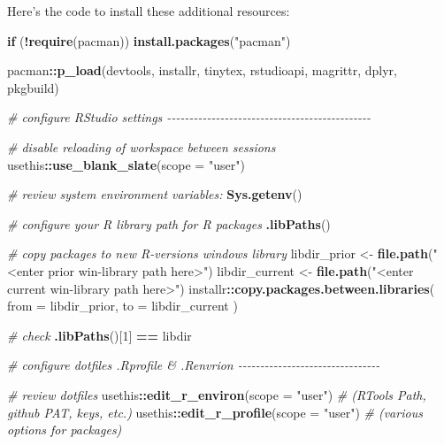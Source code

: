 \documentclass[
]{book}
\newenvironment{Shaded}{\begin{snugshade}}{\end{snugshade}}
\newcommand{\CommentTok}[1]{\textcolor[rgb]{0.56,0.35,0.01}{\textit{#1}}}
\newcommand{\ControlFlowTok}[1]{\textcolor[rgb]{0.13,0.29,0.53}{\textbf{#1}}}
\newcommand{\DataTypeTok}[1]{\textcolor[rgb]{0.13,0.29,0.53}{#1}}
\newcommand{\DecValTok}[1]{\textcolor[rgb]{0.00,0.00,0.81}{#1}}
\newcommand{\KeywordTok}[1]{\textcolor[rgb]{0.13,0.29,0.53}{\textbf{#1}}}
\newcommand{\NormalTok}[1]{#1}
\newcommand{\OperatorTok}[1]{\textcolor[rgb]{0.81,0.36,0.00}{\textbf{#1}}}
\newcommand{\StringTok}[1]{\textcolor[rgb]{0.31,0.60,0.02}{#1}}
\begin{document}
Here's the code to install these additional resources:

\begin{Shaded}
\begin{Highlighting}[]

\ControlFlowTok{if}\NormalTok{ (}\OperatorTok{!}\KeywordTok{require}\NormalTok{(pacman)) }\KeywordTok{install.packages}\NormalTok{(}\StringTok{"pacman"}\NormalTok{)}

\NormalTok{pacman}\OperatorTok{::}\KeywordTok{p\_load}\NormalTok{(devtools, }
\NormalTok{               installr, }
\NormalTok{               tinytex, }
\NormalTok{               rstudioapi, }
\NormalTok{               magrittr,}
\NormalTok{               dplyr,}
\NormalTok{               pkgbuild)}

\CommentTok{\# configure RStudio settings {-}{-}{-}{-}{-}{-}{-}{-}{-}{-}{-}{-}{-}{-}{-}{-}{-}{-}{-}{-}{-}{-}{-}{-}{-}{-}{-}{-}{-}{-}{-}{-}{-}{-}{-}{-}{-}{-}{-}{-}{-}{-}{-}{-}{-}{-}}

\CommentTok{\# disable reloading of workspace between sessions}
\NormalTok{usethis}\OperatorTok{::}\KeywordTok{use\_blank\_slate}\NormalTok{(}\DataTypeTok{scope =} \StringTok{"user"}\NormalTok{)}

\CommentTok{\# review system environment variables:}
\KeywordTok{Sys.getenv}\NormalTok{()}

\CommentTok{\# configure your R library path for R packages}
\KeywordTok{.libPaths}\NormalTok{()}

\CommentTok{\# copy packages to new R{-}version\textquotesingle{}s windows library}
\NormalTok{libdir\_prior \textless{}{-}}\StringTok{ }\KeywordTok{file.path}\NormalTok{(}\StringTok{"\textless{}enter prior win{-}library path here\textgreater{}"}\NormalTok{)}
\NormalTok{libdir\_current \textless{}{-}}\StringTok{ }\KeywordTok{file.path}\NormalTok{(}\StringTok{"\textless{}enter current win{-}library path here\textgreater{}"}\NormalTok{)}
\NormalTok{installr}\OperatorTok{::}\KeywordTok{copy.packages.between.libraries}\NormalTok{(}
  \DataTypeTok{from =}\NormalTok{ libdir\_prior, }\DataTypeTok{to =}\NormalTok{ libdir\_current}
\NormalTok{)}

\CommentTok{\# check}
\KeywordTok{.libPaths}\NormalTok{()[}\DecValTok{1}\NormalTok{] }\OperatorTok{==}\StringTok{ }\NormalTok{libdir }

\CommentTok{\# configure dotfiles .Rprofile \& .Renvrion {-}{-}{-}{-}{-}{-}{-}{-}{-}{-}{-}{-}{-}{-}{-}{-}{-}{-}{-}{-}{-}{-}{-}{-}{-}{-}{-}{-}{-}{-}{-}{-}}

\CommentTok{\# review dotfiles}
\NormalTok{usethis}\OperatorTok{::}\KeywordTok{edit\_r\_environ}\NormalTok{(}\DataTypeTok{scope =} \StringTok{"user"}\NormalTok{) }\CommentTok{\# (RTools Path, github PAT, keys, etc.)}
\NormalTok{usethis}\OperatorTok{::}\KeywordTok{edit\_r\_profile}\NormalTok{(}\DataTypeTok{scope =} \StringTok{"user"}\NormalTok{) }\CommentTok{\# (various options for packages)}


\end{Highlighting}
\end{Shaded}
\end{document}

